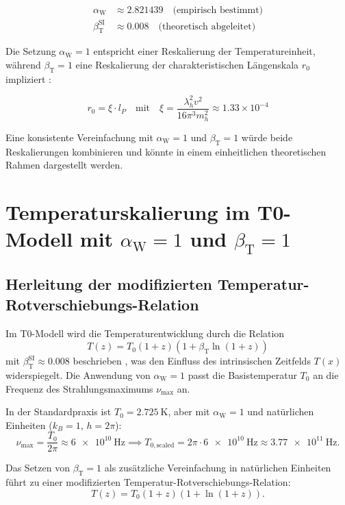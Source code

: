 \documentclass[12pt,a4paper]{article}
\newcommand{\Tfield}{T(x)}
\newcommand{\betaT}{\beta_{\text{T}}}
\newcommand{\alphaW}{\alpha_{\text{W}}}
\begin{document}
	\begin{align}
		\alphaW &\approx 2.821439 \quad \text{(empirisch bestimmt)} \\
		\betaT^{\text{SI}} &\approx 0.008 \quad \text{(theoretisch abgeleitet)}
	\end{align}
	
	Die Setzung \(\alphaW = 1\) entspricht einer Reskalierung der Temperatureinheit, während \(\betaT = 1\) eine Reskalierung der charakteristischen Längenskala \(r_0\) impliziert \cite{pascher_params_2025}:
	
	\begin{equation}
		r_0 = \xi \cdot l_P \quad \text{mit} \quad \xi = \frac{\lambda_h^2 v^2}{16\pi^3 m_h^2} \approx 1.33 \times 10^{-4}
	\end{equation}
	
	Eine konsistente Vereinfachung mit \(\alphaW = 1\) und \(\betaT = 1\) würde beide Reskalierungen kombinieren und könnte in einem einheitlichen theoretischen Rahmen dargestellt werden.
	
	\section{Temperaturskalierung im T0-Modell mit \(\alphaW = 1\) und \(\betaT = 1\)}
	
	\subsection{Herleitung der modifizierten Temperatur-Rotverschiebungs-Relation}
	
	Im T0-Modell wird die Temperaturentwicklung durch die Relation
	\begin{equation}
		T(z) = T_0 (1 + z) (1 + \betaT \ln(1 + z))
	\end{equation}
	mit \(\betaT^{\text{SI}} \approx 0.008\) beschrieben \cite{pascher_messdifferenzen_2025}, was den Einfluss des intrinsischen Zeitfelds \(\Tfield\) widerspiegelt. Die Anwendung von \(\alphaW = 1\) passt die Basistemperatur \(T_0\) an die Frequenz des Strahlungsmaximums \(\nu_{\text{max}}\) an.
	
	In der Standardpraxis ist \(T_0 = \SI{2.725}{\kelvin}\), aber mit \(\alphaW = 1\) und natürlichen Einheiten (\(k_B = 1\), \(h = 2\pi\)):
	\[
	\nu_{\text{max}} = \frac{T_0}{2\pi} \approx \SI{6e10}{\hertz} \implies T_{0,\text{scaled}} = 2\pi \cdot \SI{6e10}{\hertz} \approx \SI{3.77e11}{\hertz}.
	\]
	
	Das Setzen von \(\betaT = 1\) als zusätzliche Vereinfachung in natürlichen Einheiten führt zu einer modifizierten Temperatur-Rotverschiebungs-Relation:
	\[
	T(z) = T_0 (1 + z) (1 + \ln(1 + z)).
	\]
	
\end{document}
